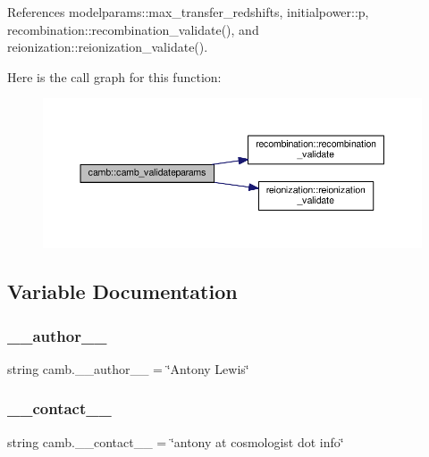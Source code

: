 References modelparams\+::max\+\_\+transfer\+\_\+redshifts, initialpower\+::p, recombination\+::recombination\+\_\+validate(), and reionization\+::reionization\+\_\+validate().

Here is the call graph for this function\+:
\nopagebreak
\begin{figure}[H]
\begin{center}
\leavevmode
\includegraphics[width=350pt]{namespacecamb_ae9577b86a4f0803e5754a23871a7113e_cgraph}
\end{center}
\end{figure}


\subsection{Variable Documentation}
\mbox{\label{namespacecamb_a85cc16a2fbdb270667e7303f2290c3be}} 
\subsubsection{\texorpdfstring{\+\_\+\+\_\+author\+\_\+\+\_\+}{\_\_author\_\_}}
{\footnotesize\ttfamily string camb.\+\_\+\+\_\+author\+\_\+\+\_\+ = \char`\"{}Antony Lewis\char`\"{}\hspace{0.3cm}{\ttfamily [private]}}

\mbox{\label{namespacecamb_af9e02319cf919d4505eab8b37179c712}} 
\subsubsection{\texorpdfstring{\+\_\+\+\_\+contact\+\_\+\+\_\+}{\_\_contact\_\_}}
{\footnotesize\ttfamily string camb.\+\_\+\+\_\+contact\+\_\+\+\_\+ = \char`\"{}antony at cosmologist dot info\char`\"{}\hspace{0.3cm}{\ttfamily [private]}}

